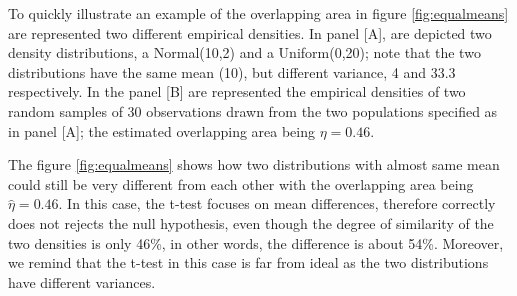 \documentclass[twocolumn]{article}\usepackage[]{graphicx}\usepackage[]{xcolor}
\begin{document}

\vspace{.3cm}

To quickly illustrate an example of the overlapping area in figure \ref{fig:equalmeans} are represented two different empirical densities. In panel [A], are depicted two density distributions, a Normal(10,2) and a Uniform(0,20); note that the two distributions have the same mean (10), but different variance, 4 and 33.3 respectively. %
In the panel [B] are represented the empirical densities of two random samples of 30 observations drawn from the two populations specified as in panel [A]; the estimated overlapping area being $\eta = 0.46$.

\vspace{.3cm}


The figure \ref{fig:equalmeans} shows how two distributions with almost same mean could still be very different from each other with the overlapping area being $\hat{\eta} = 0.46$. In this case, the t-test focuses on mean differences, therefore correctly does not rejects the null hypothesis, even though the degree of similarity of the two densities is only 46\%, in other words, the difference is about 54\%. Moreover, we remind that the t-test in this case is far from ideal as the two distributions have different variances.
\end{document}
